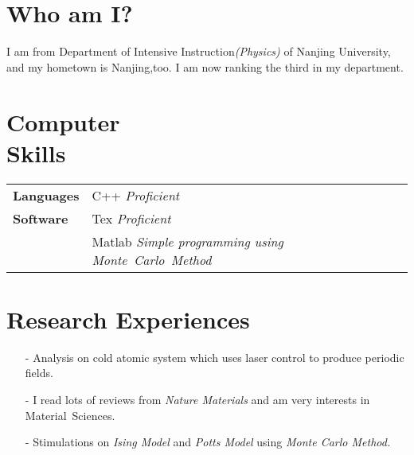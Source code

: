 \documentclass[margin]{res}
\begin{document}
\begin{resume}
\section{Who am I?}
I am from Department of Intensive Instruction\emph{(Physics)} of Nanjing University, and my hometown is Nanjing,too. I am now ranking the third in my department.
\section{Computer \\ Skills}
   \begin{tabular}{l p{4in}}
    \bf{Languages } & C++  \emph{Proficient}\\

    \bf{Software } & Tex  \emph{Proficient}\\
                   & Matlab  \emph{Simple programming using \mbox{Monte Carlo Method}}\\
 \end{tabular}

\section{Research Experiences}
  \begin{itemize} \itemsep -2pt  %
  \item [-]Analysis on cold atomic system which uses laser control to produce periodic fields.
  \item [-]I read lots of reviews from \emph{Nature Materials} and am very interests in \mbox{Material Sciences}.
  \item [-]Stimulations on \emph{Ising Model} and \emph{Potts Model} using \emph{Monte Carlo Method.}
 \end{itemize}

\end{resume}
\end{document}
